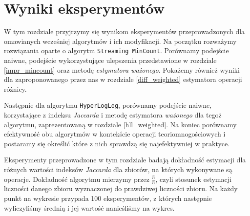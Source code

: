 \chapter{Wyniki eksperymentów}
\thispagestyle{chapterBeginStyle}

W tym rozdziale przyjrzymy się wynikom  eksperymentów przeprowadzonych dla omawianych wcześniej algorytmów i ich modyfikacji. Na początku rozważymy rozwiązania oparte o algorytm \texttt{Streaming MinCount}. 
Porównamy podejście naiwne, podejście wykorzystujące ulepszenia przedstawione w rozdziale \ref{impr_mincount} oraz metodę \textit{estymatora ważonego}. Pokażemy również wyniki dla zaproponowanego przez nas w rozdziale \ref{diff_weighted} estymatora operacji różnicy.

 Następnie dla algorytmu \texttt{HyperLogLog}, 
 porównamy podejście naiwne, korzystające z indeksu \textit{Jaccarda} i metodę estymatora \textit{ważonego} dla tegoż algorytmu, zaprezentowaną w rozdziale \ref{hll_weighted}. Na koniec porównamy efektywność obu algorytmów w kontekście operacji teoriomnogościowych i postaramy się określić które z nich sprawdzą się najefektywniej w praktyce. 

Eksperymenty przeprowadzone w tym rozdziale badają dokładność estymacji dla różnych wartości indeksów \textit{Jaccarda} dla zbiorów, na których wykonywane są operacje. Dokładność algorytmu mierzymy przez $\frac{\hat{n}}{n}$, czyli stosunek estymacji liczności danego zbioru wyznaczonej do prawdziwej liczności zbioru. Na każdy punkt na wykresie przypada 100 eksperymentów, z których następnie wyliczyliśmy średnią i jej wartość nanieśliśmy na wykres.

